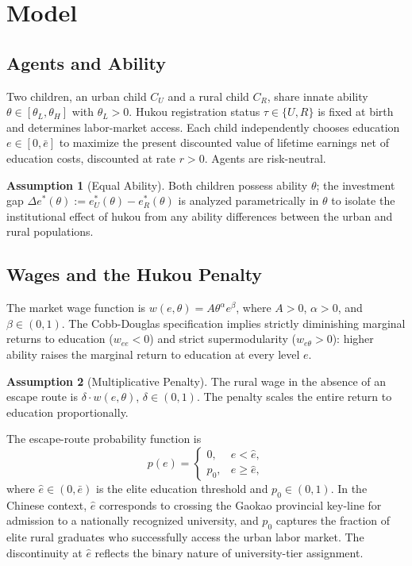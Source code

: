 \documentclass[12pt]{article}
\theoremstyle{plain}
\theoremstyle{definition}
\newtheorem{assumption}{Assumption}
\theoremstyle{remark}
\begin{document}
\section{Model}

\subsection{Agents and Ability}

Two children, an urban child $C_{U}$ and a rural child $C_{R}$, share innate
ability $\theta\in[\theta_{L},\theta_{H}]$ with $\theta_{L}>0$.  Hukou
registration status $\tau\in\{U,R\}$ is fixed at birth and determines
labor-market access.  Each child independently chooses education $e\in[0,\bar{e}]$
to maximize the present discounted value of lifetime earnings net of education
costs, discounted at rate $r>0$.  Agents are risk-neutral.

\begin{assumption}[Equal Ability]
Both children possess ability $\theta$; the investment gap
$\Delta e^{*}(\theta):=e^{*}_{U}(\theta)-e^{*}_{R}(\theta)$ is analyzed
parametrically in $\theta$ to isolate the institutional effect of hukou from
any ability differences between the urban and rural populations.
\end{assumption}

\subsection{Wages and the Hukou Penalty}

The market wage function is $w(e,\theta)=A\theta^{\alpha}e^{\beta}$, where
$A>0$, $\alpha>0$, and $\beta\in(0,1)$.  The Cobb-Douglas specification implies
strictly diminishing marginal returns to education ($w_{ee}<0$) and strict
supermodularity ($w_{e\theta}>0$): higher ability raises the marginal return to
education at every level $e$.

\begin{assumption}[Multiplicative Penalty]
The rural wage in the absence of an escape route is $\delta\cdot w(e,\theta)$,
$\delta\in(0,1)$.  The penalty scales the entire return to education
proportionally.
\end{assumption}

The escape-route probability function is
\begin{equation}
  p(e)=\begin{cases}0, & e<\hat{e},\\p_{0}, & e\geq\hat{e},\end{cases}
  \label{eq:escape}
\end{equation}
where $\hat{e}\in(0,\bar{e})$ is the elite education threshold and
$p_{0}\in(0,1)$.  In the Chinese context, $\hat{e}$ corresponds to crossing the
Gaokao provincial key-line for admission to a nationally recognized university,
and $p_{0}$ captures the fraction of elite rural graduates who successfully access
the urban labor market.  The discontinuity at $\hat{e}$ reflects the binary
nature of university-tier assignment.
\end{document}
